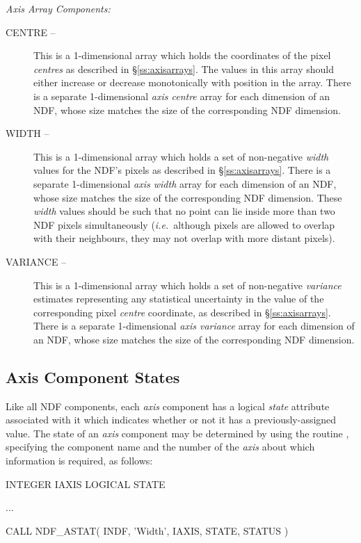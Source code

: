\documentclass[twoside,11pt,nolof]{starlink}
\providecommand{\st}[1]{{\emph{#1}}}
\begin{document}
{\large \st{Axis Array Components:}}\nopagebreak
\begin{description}

\item[CENTRE --] This is a 1-dimensional array which holds the
coordinates of the pixel \st{centres\/} as described in
\S\ref{ss:axisarrays}. The values in this array should either increase
or decrease monotonically with position in the array. There is a
separate 1-dimensional \st{axis centre\/} array for each dimension of
an NDF, whose size matches the size of the corresponding NDF dimension.

\item[WIDTH --] This is a 1-dimensional array which holds a set of
non-negative \st{width\/} values for the NDF's pixels as described in
\S\ref{ss:axisarrays}.  There is a separate 1-dimensional \st{axis
width\/} array for each dimension of an NDF, whose size matches the
size of the corresponding NDF dimension. These \st{width} values
should be such that no point can lie inside more than two NDF pixels
simultaneously (\st{i.e.}\ although pixels are allowed to overlap with
their neighbours, they may not overlap with more distant pixels).

\item[VARIANCE --] This is a 1-dimensional array which holds a set of
non-negative \st{variance\/} estimates representing any statistical
uncertainty in the value of the corresponding pixel \st{centre\/}
coordinate, as described in \S\ref{ss:axisarrays}.  There is a
separate 1-dimensional \st{axis variance\/} array for each dimension
of an NDF, whose size matches the size of the corresponding NDF
dimension.

\end{description}

\subsection{Axis Component States}

Like all NDF components, each \st{axis\/} component has a logical
\st{state\/} attribute associated with it which indicates whether or
not it has
a previously-assigned value.
The state of an \st{axis\/} component may be determined by using the routine
, specifying the component name and the number of the \st{axis\/}
about which information is required, as follows:

\small
\begin{terminalv}
      INTEGER IAXIS
      LOGICAL STATE

      ...

      CALL NDF_ASTAT( INDF, 'Width', IAXIS, STATE, STATUS )
\end{terminalv}
\normalsize
\end{document}
